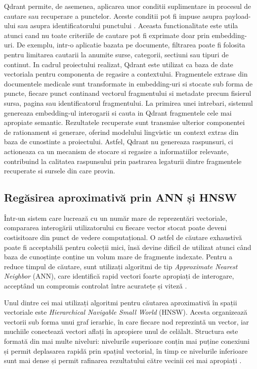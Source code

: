 \documentclass[12pt, a4paper, oneside, romanian]{teza-upb}
\begin{document}
Qdrant permite, de asemenea, aplicarea unor conditii suplimentare in procesul de cautare sau recuperare a punctelor. Aceste conditii pot fi impuse asupra payload-ului sau asupra identificatorului punctului \cite{qdrant_filtering}. Aceasta functionalitate este utila atunci cand nu toate criteriile de cautare pot fi exprimate doar prin embedding-uri. De exemplu, intr-o aplicatie bazata pe documente, filtrarea poate fi folosita pentru limitarea cautarii la anumite surse, categorii, sectiuni sau tipuri de continut.
In cadrul proiectului realizat, Qdrant este utilizat ca baza de date vectoriala pentru componenta de regasire a contextului. Fragmentele extrase din documentele medicale sunt transformate in embedding-uri si stocate sub forma de puncte, fiecare punct continand vectorul fragmentului si metadate precum fisierul sursa, pagina sau identificatorul fragmentului. La primirea unei intrebari, sistemul genereaza embedding-ul interogarii si cauta in Qdrant fragmentele cele mai apropiate semantic. Rezultatele recuperate sunt transmise ulterior componentei de rationament si generare, oferind modelului lingvistic un context extras din baza de cunostinte a proiectului. Astfel, Qdrant nu genereaza raspunsuri, ci actioneaza ca un mecanism de stocare si regasire a informatiilor relevante, contribuind la calitatea raspunsului prin pastrarea legaturii dintre fragmentele recuperate si sursele din care provin.

\subsection{Regăsirea aproximativă prin ANN și HNSW}

Într-un sistem care lucrează cu un număr mare de reprezentări vectoriale, compararea interogării utilizatorului cu fiecare vector stocat poate deveni costisitoare din punct de vedere computațional. O astfel de căutare exhaustivă poate fi acceptabilă pentru colecții mici, însă devine dificil de utilizat atunci când baza de cunoștințe conține un volum mare de fragmente indexate. Pentru a reduce timpul de căutare, sunt utilizați algoritmi de tip \textit{Approximate Nearest Neighbor} (ANN), care identifică rapid vectori foarte apropiați de interogare, acceptând un compromis controlat între acuratețe și viteză \cite{malkov2018hnsw}.

Unul dintre cei mai utilizați algoritmi pentru căutarea aproximativă în spații vectoriale este \textit{Hierarchical Navigable Small World} (HNSW). Acesta organizează vectorii sub forma unui graf ierarhic, în care fiecare nod reprezintă un vector, iar muchiile conectează vectori aflați în apropiere unul de celălalt. Structura este formată din mai multe niveluri: nivelurile superioare conțin mai puține conexiuni și permit deplasarea rapidă prin spațiul vectorial, în timp ce nivelurile inferioare sunt mai dense și permit rafinarea rezultatului către vecinii cei mai apropiați \cite{malkov2018hnsw}.
\end{document}
